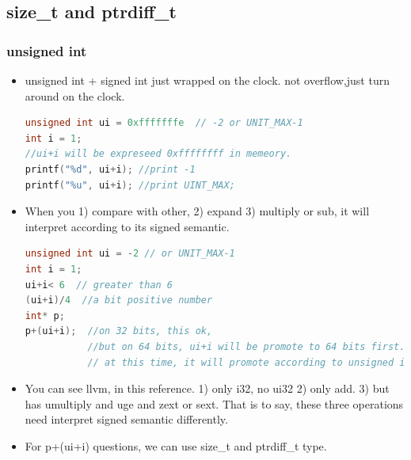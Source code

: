 \documentclass[a4paper,12pt,twoside]{book}
\begin{document}
\subsection{size\_t and ptrdiff\_t}

\subsubsection{unsigned int}
\begin{itemize}
	\item unsigned int + signed int just wrapped on the clock. not overflow,just turn around on the clock. 
	
\begin{lstlisting}[frame=single, language=c++]
unsigned int ui = 0xfffffffe  // -2 or UNIT_MAX-1
int i = 1;
//ui+i will be expreseed 0xffffffff in memeory. 
printf("%d", ui+i); //print -1
printf("%u", ui+i); //print UINT_MAX;
	\end{lstlisting}
	
	\item When you 1) compare with other, 2) expand 3) multiply or sub, it will interpret according to its signed semantic. 
\begin{lstlisting}[frame=single, language=c++]
unsigned int ui = -2 // or UNIT_MAX-1
int i = 1;
ui+i< 6  // greater than 6
(ui+i)/4  //a bit positive number
int* p;
p+(ui+i);  //on 32 bits, this ok, 
           //but on 64 bits, ui+i will be promote to 64 bits first.
           // at this time, it will promote according to unsigned int.
\end{lstlisting}
	
	\item You can see llvm, in this reference. 1) only i32, no ui32 2) only add.  3) but has umultiply and uge and zext or sext. That is to say, these three operations need interpret signed semantic differently. 
	
	\item For p+(ui+i) questions, we can use size\_t and ptrdiff\_t type. 
\end{itemize}
\end{document}
